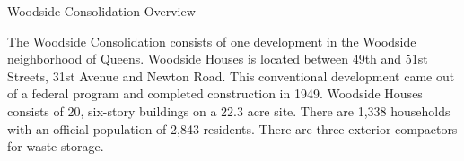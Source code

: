 Woodside Consolidation Overview

The Woodside Consolidation consists of one development in the Woodside neighborhood of Queens. Woodside Houses is located between 49th and 51st Streets, 31st Avenue and Newton Road. This conventional development came out of a federal program and completed construction in 1949. Woodside Houses consists of 20, six-story buildings on a 22.3 acre site. There are 1,338 households with an official population of 2,843 residents. There are three exterior compactors for waste storage.